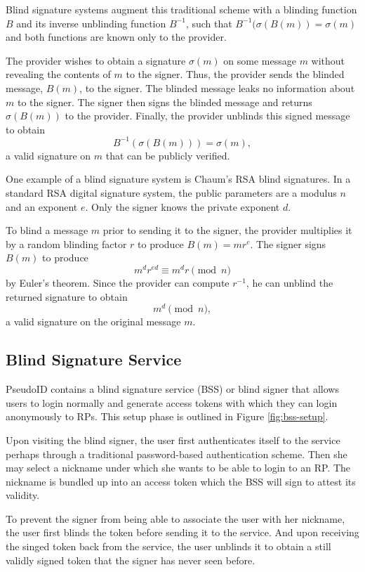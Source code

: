 \documentclass{llncs}
\begin{document}
Blind signature systems \cite{Cha82} augment this traditional scheme with a
blinding function $B$ and its inverse unblinding function $B^{-1}$, such that
$B^{-1}(\sigma(B(m)) = \sigma(m)$ and both functions are known only to the
provider.

The provider wishes to obtain a signature $\sigma(m)$ on some message $m$ without
revealing the contents of $m$ to the signer. Thus, the provider sends the
blinded message, $B(m)$, to the signer. The blinded message leaks no information
about $m$ to the signer. The signer then signs the blinded message and returns
$\sigma(B(m))$ to the provider. Finally, the provider unblinds this signed
message to obtain
$$B^{-1}(\sigma(B(m))) = \sigma(m),$$
a valid signature on $m$ that can be publicly verified.

One example of a blind signature system is Chaum's RSA blind signatures. In a
standard RSA digital signature system, the public parameters are a modulus $n$
and an exponent $e$. Only the signer knows the private exponent $d$.

To blind a message $m$ prior to sending it to the signer, the provider
multiplies it by a random blinding factor $r$ to produce $B(m) = mr^e$. The
signer signs $B(m)$ to produce
$$m^d r^{ed} \equiv m^d r \pmod n$$
by Euler's theorem. Since the provider can compute $r^{-1}$, he can unblind the
returned signature to obtain
$$m^d \pmod n,$$
a valid signature on the original message $m$.


\subsection{Blind Signature Service}

PseudoID contains a blind signature service (BSS) or blind signer that allows
users to login normally and generate access tokens with which they can login
anonymously to RPs. This setup phase is outlined in Figure \ref{fig:bss-setup}.

Upon visiting the blind signer, the user first authenticates itself to the
service perhaps through a traditional password-based authentication scheme. Then
she may select a nickname under which she wants to be able to login to an RP.
The nickname is bundled up into an access token which the BSS will sign to
attest its validity.

To prevent the signer from being able to associate the user with her nickname,
the user first blinds the token before sending it to the service. And upon
receiving the singed token back from the service, the user unblinds it to obtain
a still validly signed token that the signer has never seen before.
\end{document}
